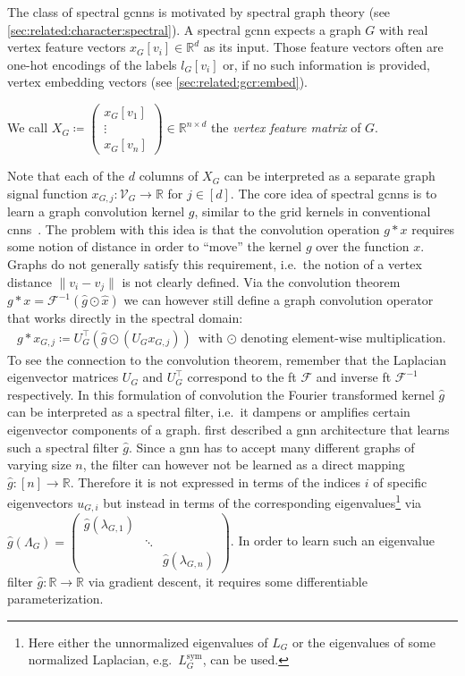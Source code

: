 The class of spectral \acp{gcnn} is motivated by spectral graph theory (see \cref{sec:related:character:spectral}).
A spectral \ac{gcnn} expects a graph $G$ with real vertex feature vectors $x_G[v_i] \in \mathbb{R}^d$ as its input.
Those feature vectors often are one-hot encodings of the labels $l_G[v_i]$ or, if no such information is provided, vertex embedding vectors (see \cref{sec:related:gcr:embed}).
\begin{defn}\label{defn:related:vertex-feature-matrix}
		We call $X_G \coloneqq \begin{pmatrix} x_G[v_1] \\ \vdots \\ x_G[v_n] \end{pmatrix} \in \mathbb{R}^{n \times d}$ the \textit{vertex feature matrix} of $G$.
\end{defn}
Note that each of the $d$ columns of $X_G$ can be interpreted as a separate graph signal function $x_{G,j}: \mathcal{V}_G \to \mathbb{R}$ for $j \in [d]$.
The core idea of spectral \acp{gcnn} is to learn a graph convolution kernel $g$, similar to the grid kernels in conventional \acp{cnn}~\cite{LeCun1998}.
The problem with this idea is that the convolution operation $g * x$ requires some notion of distance in order to ``move'' the kernel $g$ over the function $x$.
Graphs do not generally satisfy this requirement, i.e.\ the notion of a vertex distance $\|v_i - v_j\|$ is not clearly defined.
Via the convolution theorem $g * x = \mathcal{F}^{-1}(\hat{g} \odot \hat{x})$ we can however still define a graph convolution operator that works directly in the spectral domain:
\begin{align}
	g * x_{G,j} \coloneqq U_G^{\top} (\hat{g} \odot (U_G x_{G,j}))
	\text{ with $\odot$ denoting element-wise multiplication.} \label{eq:related:graph-conv-general}
\end{align}
To see the connection to the convolution theorem, remember that the Laplacian eigenvector matrices $U_G$ and $U_G^{\top}$ correspond to the \ac{ft} $\mathcal{F}$ and inverse \ac{ft} $\mathcal{F}^{-1}$ respectively.
In this formulation of convolution the Fourier transformed kernel $\hat{g}$ can be interpreted as a spectral filter, i.e.\ it dampens or amplifies certain eigenvector components of a graph.
\citet{Bruna2013}\cite{Henaff2015} first described a \ac{gnn} architecture that learns such a spectral filter $\hat{g}$.
Since a \ac{gnn} has to accept many different graphs of varying size $n$, the filter can however not be learned as a direct mapping $\hat{g}: [n] \to \mathbb{R}$.
Therefore it is not expressed in terms of the indices $i$ of specific eigenvectors $u_{G,i}$ but instead in terms of the corresponding eigenvalues\footnote{
	Here either the unnormalized eigenvalues of $L_G$ or the eigenvalues of some normalized Laplacian, e.g.\ $L_G^{\text{sym}}$, can be used.
} via $\hat{g}(\Lambda_G) = \begin{pmatrix} \hat{g}(\lambda_{G,1}) & & \\ & \ddots & \\ & & \hat{g}(\lambda_{G,n}) \end{pmatrix}$.
In order to learn such an eigenvalue filter $\hat{g}: \mathbb{R} \to \mathbb{R}$ via gradient descent, it requires some differentiable parameterization.


